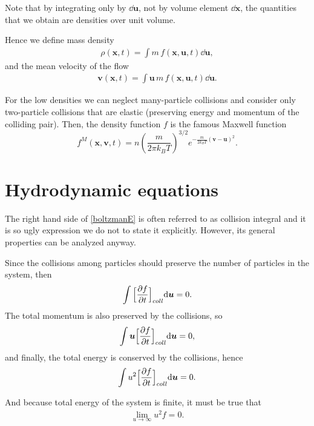 Note that by integrating only by $\dd \bm{u}$, not by volume element $\dd \bm{x}$, the quantities that we obtain are densities over unit volume.

Hence we define mass density
\begin{align} \label{densb}
\rho(\bm{x},t) = \int m \, f(\bm{x,u},t) \dd \bm{u},
\end{align}
and the mean velocity of the flow
\begin{align} \label{meanv}
\bm{v}(\bm{x},t) = \int \bm{u} \, m \, f(\bm{x,u},t) \dd \bm{u}.
\end{align}

For the low densities we can neglect many-particle collisions and  consider only two-particle collisions that are elastic (preserving energy and momentum of the colliding pair).
Then, the density function $f$ is the famous Maxwell function
\begin{equation} \label{Maxwell}
f^M(\bm{x,v,}t) = n(\frac{m}{2 \pi k_B T})^{3/2} e^{-\frac{m}{2k_B T}(\bm{v-u})^2}.
\end{equation}

\section{Hydrodynamic equations}
The right hand side of \ref{boltzmanE} is often referred to as collision integral and it is so ugly expression we do not to state it explicitly. However, its general properties can be analyzed anyway.

Since the collisions among particles should preserve the number of particles in the system, then
\begin{align} \label{consm}
\int \Big[\frac{\partial f}{\partial t} \Big]_{coll} \mathrm{d} \bm{u} = 0.
\end{align}
The total momentum is also preserved by the collisions, so
\begin{align} \label{consmm}
\int \bm{u} \Big[\frac{\partial f}{\partial t} \Big]_{coll} \mathrm{d} \bm{u} = 0,
\end{align}
and finally, the total energy is conserved by the collisions, hence
\begin{align} \label{conse}
\int u^2 \Big[\frac{\partial f}{\partial t} \Big]_{coll} \mathrm{d} \bm{u} = 0.
\end{align}

And because total energy of the system is finite, it must be true that
\begin{align} \label{lime}
\lim_{u \rightarrow \infty} u^2 f = 0.
\end{align}


